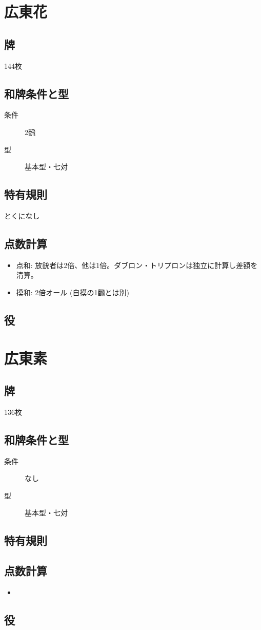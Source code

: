 \documentclass{ltjsarticle}
\begin{document}
\section{広東花}
\subsection{牌}144枚
\subsection{和牌条件と型}
\begin{description}
    \item[条件] 2飜
    \item[型] 基本型・七対
\end{description}
\subsection{特有規則}
とくになし
\subsection{点数計算}
\begin{itemize}
    \item 点和: 放銃者は2倍、他は1倍。ダブロン・トリプロンは独立に計算し差額を清算。
    \item 摸和: 2倍オール (自摸の1飜とは別)
\end{itemize}
\subsection{役}
\begin{description}
    \item[]
\end{description}
\section{広東素}
\subsection{牌}136枚
\subsection{和牌条件と型}
\begin{description}
    \item[条件] なし
    \item[型] 基本型・七対
\end{description}
\subsection{特有規則}
\begin{description}
    \item[]
\end{description}
\subsection{点数計算}
\begin{itemize}
    \item
\end{itemize}
\subsection{役}
\begin{description}
    \item[]
\end{description}
\end{document}
